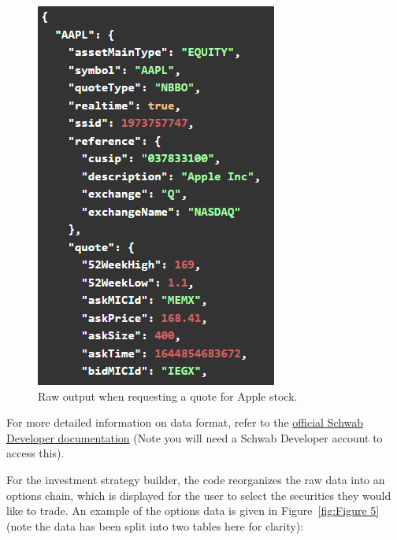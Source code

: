 \documentclass{article}
\begin{document}
\begin{figure}
    \begin{center}
    \includegraphics[scale=1]{example_quote.png}
    \caption{\label{fig:Figure 4}Raw output when requesting a quote for Apple stock.}
    \end{center}
\end{figure}



For more detailed information on data format, refer to the \href{https://developer.schwab.com/products/trader-api--individual/details/specifications/Market%20Data%20Production}{official Schwab Developer documentation} (Note you will need a Schwab Developer account to access this). 

\indent For the investment strategy builder, the code reorganizes the raw data into an options chain, which is displayed for the user to select the securities they would like to trade. An example of the options data is given in Figure~\ref{fig:Figure 5} (note the data has been split into two tables here for clarity): 
\end{document}
